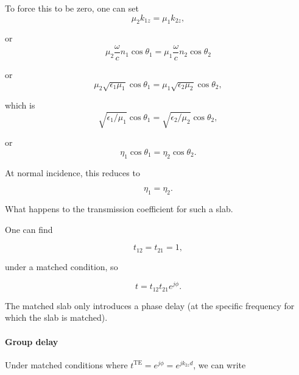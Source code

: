 To force this to be zero, one can set
\begin{dmath}\label{eqn:emtLecture10:360}
\mu_2 k_{1z} = \mu_1 k_{2z},
\end{dmath}

or
\begin{dmath}\label{eqn:emtLecture10:380}
   \mu_2 \frac{\omega}{c} n_1 \cos \theta_1 =
   \mu_1 \frac{\omega}{c} n_2 \cos \theta_2
\end{dmath}

or
\begin{dmath}\label{eqn:emtLecture10:400}
   \mu_2 \sqrt{\epsilon_1 \mu_1} \cos \theta_1 = \mu_1 \sqrt{\epsilon_2 \mu_2} \cos \theta_2,
\end{dmath}

which is
\begin{dmath}\label{eqn:emtLecture10:420}
   \sqrt{\epsilon_1/\mu_1} \cos \theta_1 = \sqrt{\epsilon_2/\mu_2} \cos \theta_2,
\end{dmath}

or
\begin{dmath}\label{eqn:emtLecture10:440}
   \eta_1 \cos \theta_1 = \eta_2 \cos \theta_2.
\end{dmath}

At normal incidence, this reduces to

\begin{dmath}\label{eqn:emtLecture10:460}
   \eta_1 = \eta_2.
\end{dmath}

What happens to the transmission coefficient for such a slab.

One can find 

\begin{equation}\label{eqn:emtLecture10:480}
t_{12} = t_{21} = 1,
\end{equation}

under a matched condition, so

\begin{equation}\label{eqn:emtLecture10:500}
   t = t_{12} t_{21} e^{j \phi}.
\end{equation}

The matched slab only introduces a phase delay (at the specific frequency for which the slab is matched).

\paragraph{Group delay}

Under matched conditions where \( t^{\textrm{TE}} = e^{j \phi} = e^{j k_{2z} d} \), we can write

